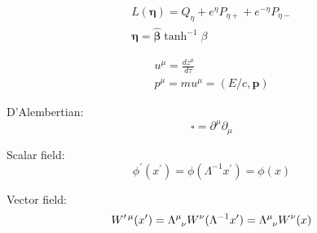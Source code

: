 \documentclass[a4paper, twocolumn]{article}
\renewcommand{\vec}[1]{\boldsymbol{#1}}
\begin{document}
\begin{align*}
    L(\vec{\eta}) = Q_{\eta} + e^{\eta} P_{\eta +} + e^{-\eta}P_{\eta-} \\
    \vec{\eta} = \hat{\vec{\beta}} \tanh^{-1} \beta
\end{align*}

\begin{align*}
    u^{\mu} = \frac{d z^{\mu}}{d \tau} \\
    p^{\mu} = m u^{\mu} = (E/c, \vec{p})
\end{align*}

D'Alembertian:
\begin{equation*}
    \square = \partial^{\mu} \partial_{\mu}
\end{equation*}

Scalar field:
\begin{equation*}
    \phi^{\prime}(x^{\prime}) = \phi(\Lambda^{-1}x^{\prime}) = \phi(x)
\end{equation*}

Vector field:
\begin{equation*}
    W^{\prime \, \mu}(x^{\prime})
    = \tensor{\Lambda}{^\mu_\nu} W^{\nu}(\Lambda^{-1}x^{\prime})
    = \tensor{\Lambda}{^\mu_\nu} W^{\nu}(x)
\end{equation*}
\end{document}
